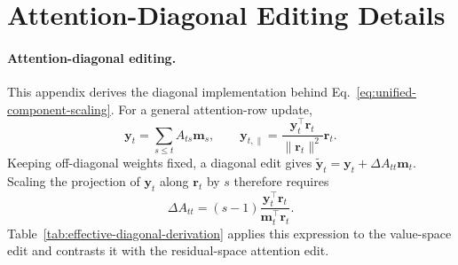 \appendix
\clearpage

\section{Attention-Diagonal Editing Details}
\label{app:method}

\paragraph{Attention-diagonal editing.}
This appendix derives the diagonal implementation behind
Eq.~\ref{eq:unified-component-scaling}. For a general attention-row update,
\[ 
  \mathbf{y}_t=\sum_{s\le t} A_{ts}\mathbf{m}_s,\qquad
  \mathbf{y}_{t,\parallel}
  =
  \frac{\mathbf{y}_t^\top\mathbf{r}_t}{\|\mathbf{r}_t\|^2}\mathbf{r}_t .
\]
Keeping off-diagonal weights fixed, a diagonal edit gives
\(\widetilde{\mathbf{y}}_t=\mathbf{y}_t+\Delta A_{tt}\mathbf{m}_t\). Scaling
the projection of \(\mathbf{y}_t\) along \(\mathbf{r}_t\) by \(s\) therefore
requires
\[
  \Delta A_{tt}
  =
  (s-1)
  \frac{\mathbf{y}_t^\top\mathbf{r}_t}
       {\mathbf{m}_t^\top\mathbf{r}_t}.
\]
Table~\ref{tab:effective-diagonal-derivation} applies this expression to the
value-space edit and contrasts it with the residual-space attention edit.

